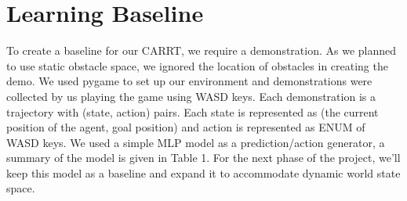 \documentclass{article}
\begin{document}
\section{Learning Baseline}
To create a baseline for our CARRT, we require a demonstration. As we planned to use static obstacle space, we ignored the location of obstacles in creating the demo.
We used pygame to set up our environment and demonstrations were collected by us playing the game using WASD keys. Each demonstration is a trajectory with (state, action) pairs. Each state is represented as (the current position of the agent, goal position) and action is represented as ENUM of WASD keys.
We used a simple MLP model as a prediction/action generator, a summary of the model is given in Table 1.
For the next phase of the project, we'll keep this model as a baseline and expand it to accommodate dynamic world state space.

\end{document}
